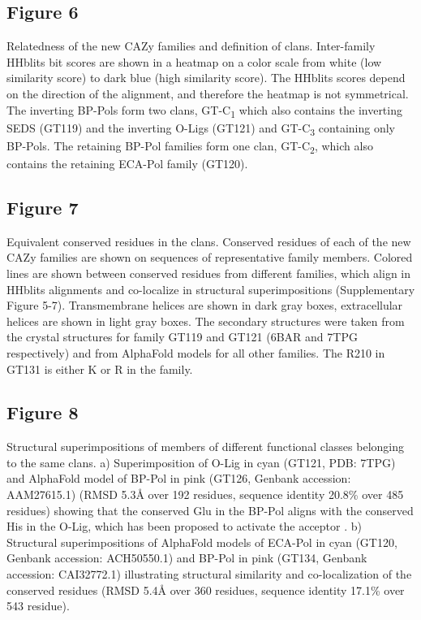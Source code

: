 \documentclass{article}
\begin{document}
\subsection{Figure 6}
Relatedness of the new CAZy families and definition of clans. Inter-family HHblits bit scores are shown in a heatmap on a color scale from white (low similarity score) to dark blue (high similarity score). The HHblits scores depend on the direction of the alignment, and therefore the heatmap is not symmetrical. The inverting BP-Pols form two clans, GT-C\textsubscript{1} which also contains the inverting SEDS (GT119) and the inverting O-Ligs (GT121) and GT-C\textsubscript{3} containing only BP-Pols. The retaining BP-Pol families form one clan, GT-C\textsubscript{2}, which also contains the retaining ECA-Pol family (GT120).

\subsection{Figure 7}
Equivalent conserved residues in the clans. Conserved residues of each of the new CAZy families are shown on sequences of representative family members. Colored lines are shown between conserved residues from different families, which align in HHblits alignments and co-localize in structural superimpositions (Supplementary Figure 5-7). Transmembrane helices are shown in dark gray boxes, extracellular helices are shown in light gray boxes. The secondary structures were taken from the crystal structures for family GT119 and GT121 (6BAR and 7TPG respectively) and from AlphaFold models for all other families. The R210 in GT131 is either K or R in the family.

\subsection{Figure 8}
Structural superimpositions of members of different functional classes belonging to the same clans. a) Superimposition of O-Lig in cyan (GT121, PDB: 7TPG) and AlphaFold model of BP-Pol in pink (GT126, Genbank accession: AAM27615.1) (RMSD 5.3Å over 192 residues, sequence identity 20.8\% over 485 residues) showing that the conserved Glu in the BP-Pol aligns with the conserved His in the O-Lig, which has been proposed to activate the acceptor \cite{ashraf_structural_2022}. b) Structural superimpositions of AlphaFold models of ECA-Pol in cyan (GT120, Genbank accession: ACH50550.1) and BP-Pol in pink (GT134, Genbank accession: CAI32772.1) illustrating structural similarity and co-localization of the conserved residues (RMSD 5.4Å over 360 residues, sequence identity 17.1\% over 543 residue).
\end{document}
